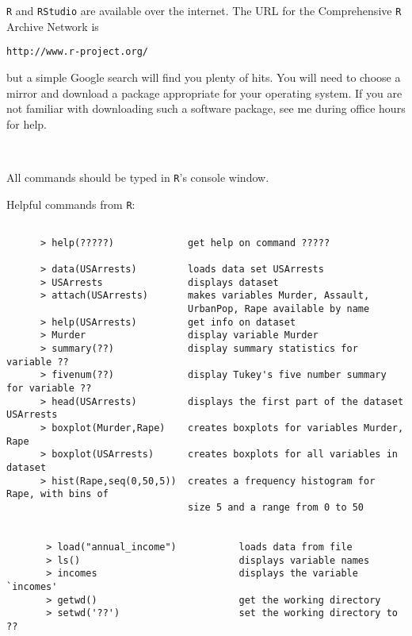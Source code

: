 \documentclass{report}
\begin{document}
 \newpage

{\tt R} and {\tt RStudio} are available over the internet.  The URL for the Comprehensive {\tt R}
Archive Network is

\centerline{\tt http://www.r-project.org/}

\noindent but a simple Google search will find you plenty of hits.
You will need to choose a mirror and download a
package appropriate for your operating system.  If you are not
familiar with downloading such a software package, see me during
office hours for help.

\

\noindent All commands should be typed in {\tt R}'s console window.

\smallskip

Helpful commands from {\tt R}:

\begin{verbatim}

      > help(?????)             get help on command ?????

      > data(USArrests)         loads data set USArrests
      > USArrests               displays dataset
      > attach(USArrests)       makes variables Murder, Assault,
                                UrbanPop, Rape available by name
      > help(USArrests)         get info on dataset
      > Murder                  display variable Murder
      > summary(??)             display summary statistics for variable ??
      > fivenum(??)             display Tukey's five number summary for variable ??
      > head(USArrests)         displays the first part of the dataset USArrests
      > boxplot(Murder,Rape)    creates boxplots for variables Murder, Rape
      > boxplot(USArrests)      creates boxplots for all variables in dataset
      > hist(Rape,seq(0,50,5))  creates a frequency histogram for Rape, with bins of
                                size 5 and a range from 0 to 50
                                
                                
       > load("annual_income")           loads data from file
       > ls()                            displays variable names
       > incomes                         displays the variable `incomes'
       > getwd()                         get the working directory
       > setwd('??')                     set the working directory to ??
\end{verbatim}
\end{document}
